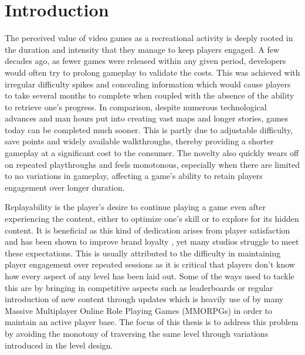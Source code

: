 \documentclass{Configuration_Files/PoliMi3i_thesis}
\begin{document}
\mainmatter %

\chapter{Introduction}
\label{ch:introduction}%

The perceived value of video games as a recreational activity is deeply rooted in the 
duration and intensity that they manage to keep players engaged. A few decades 
ago, as fewer games were released within any given period, developers would often 
try to prolong gameplay to validate the costs. This was achieved with irregular 
difficulty spikes and concealing information which would cause players to take several 
months to complete when coupled with the absence of the ability to retrieve 
one’s progress. In comparison, despite numerous technological advances and man hours 
put into creating vast maps and longer stories, games today can be completed much 
sooner. This is partly due to adjustable difficulty, save points and widely available 
walkthroughs, thereby providing a shorter gameplay at a significant cost to the consumer. 
The novelty also quickly wears off on repeated playthroughs and feels monotonous, 
especially when there are limited to no variations in gameplay, affecting a game’s 
ability to retain players engagement over longer duration.

Replayability is the player’s desire to continue playing a game even after 
experiencing the content, either to optimize one’s skill or to explore for its hidden 
content. It is beneficial as this kind of dedication arises from player satisfaction and 
has been shown to improve brand loyalty \cite{TiF11}, yet many studios struggle to meet these 
expectations. This is usually attributed to the difficulty in maintaining player 
engagement over repeated sessions as it is critical that players don't know how every 
aspect of any level has been laid out. Some of the ways used to tackle this are by 
bringing in competitive aspects such as leaderboards or regular introduction of new 
content through updates which is heavily use of by many Massive Multiplayer Online 
Role Playing Games (MMORPGs) in order to maintain an active player base. The focus of this 
thesis is to address this problem by avoiding the monotony of traversing the same level through 
variations introduced in the level design.
\newpage
\end{document}
